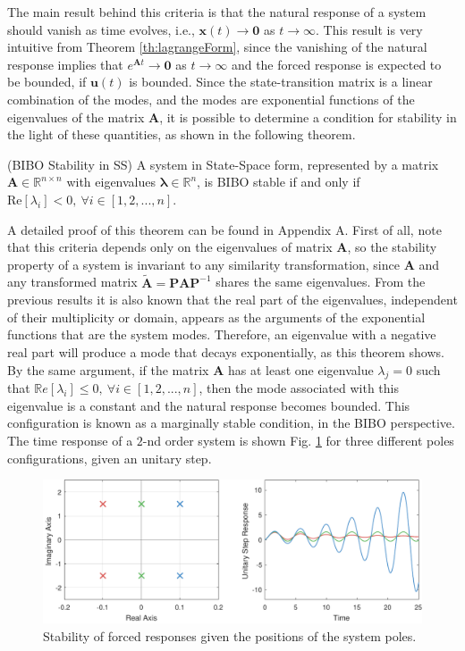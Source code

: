 \documentclass[a4paper,11pt]{book}
\numberwithin{figure}{chapter}
\numberwithin{equation}{chapter}
\numberwithin{table}{chapter}
\newtheorem{theorem}{Theorem}[chapter]
\theoremstyle{definition}
\newcounter{boxed-theorem}
\newenvironment{boxed-theorem}[1]
{\colorlet{shadecolor}{pastelBlue2!5} \begin{shaded} \begin{theorem}{#1}}
{\end{theorem} \end{shaded}}
\newcounter{boxed-lemma}
\newcounter{boxed-definition}
\newcounter{boxed-example}
\begin{document}
The main result behind this criteria is that the natural response of a system should vanish as time evolves, i.e., $\bm{x}(t) \to \bm{0}$ as $t \to \infty$. This result is very intuitive from Theorem \ref{th:lagrangeForm}, since the vanishing of the natural response implies that $e^{\bm{A} t} \to \bm{0}$ as $t \to \infty$ and the forced response is expected to be bounded, if $\bm{u}(t)$ is bounded. Since the state-transition matrix is a linear combination of the modes, and the modes are exponential functions of the eigenvalues of the matrix $\bm{A}$, it is possible to determine a condition for stability in the light of these quantities, as shown in the following theorem.

\begin{boxed-theorem}{(BIBO Stability in SS)} \label{th:BIBOStab}
    A system in State-Space form, represented by a matrix $\bm{A} \in \mathbb{R}^{n \times n}$ with eigenvalues $\bm{\lambda} \in \mathbb{R}^n$, is BIBO stable if and only if $\text{Re}[\lambda_i] < 0,\ \forall i \in [1,2,...,n]$.
\end{boxed-theorem}

A detailed proof of this theorem can be found in Appendix A. First of all, note that this criteria depends only on the eigenvalues of matrix $\bm{A}$, so the stability property of a system is invariant to any similarity transformation, since $\bm{A}$ and any transformed matrix $\tilde{\bm{A}} = \bm{P} \bm{A} \bm{P}^{-1}$ shares the same eigenvalues. From the previous results it is also known that the real part of the eigenvalues, independent of their multiplicity or domain, appears as the arguments of the exponential functions that are the system modes. Therefore, an eigenvalue with a negative real part will produce a mode that decays exponentially, as this theorem shows. By the same argument, if the matrix $\bm{A}$ has at least one eigenvalue $\lambda_j = 0$ such that $\mathbb{R}e[\lambda_i] \leq 0,\ \forall i \in [1,2,...,n]$, then the mode associated with this eigenvalue is a constant and the natural response becomes bounded. This configuration is known as a marginally stable condition, in the BIBO perspective. The time response of a $2$-nd order system is shown Fig. \ref{fig:stability01} for three different poles configurations, given an unitary step.

\begin{figure}[ht] \centering
    \includegraphics[width=\textwidth]{chapter2/stability01}
    
    \caption{Stability of forced responses given the positions of the system poles.}
    \label{fig:stability01}
\end{figure} 
\end{document}
